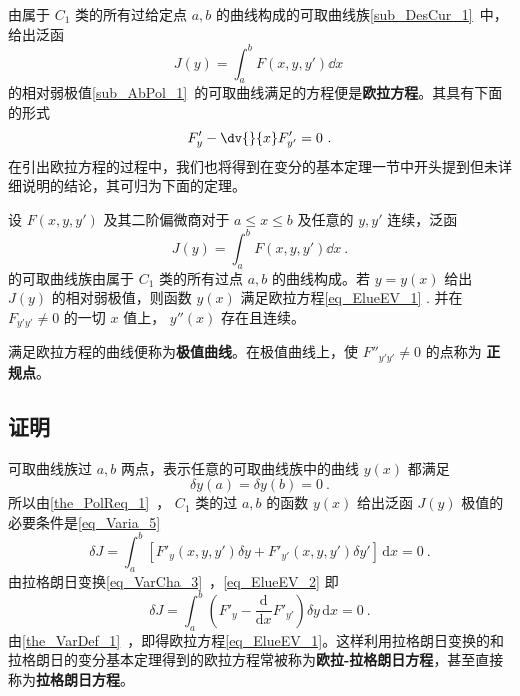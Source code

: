 
由属于 $C_1$ 类的所有过给定点 $a,b$ 的曲线构成的可取曲线族\autoref{sub_DesCur_1}~中，给出泛函 
\begin{equation}
J(y)=\int_a^bF(x,y,y')\dd x~
\end{equation}
的相对弱极值\autoref{sub_AbPol_1}~的可取曲线满足的方程便是\textbf{欧拉方程}。其具有下面的形式
\begin{equation}\label{eq_ElueEV_1}
F'_y-\dv{}{x}F'_{y'}=0~.
\end{equation}
在引出欧拉方程的过程中，我们也将得到在变分的基本定理一节中开头提到但未详细说明的结论，其可归为下面的定理。
\begin{theorem}{}
设 $F(x,y,y')$ 及其二阶偏微商对于 $a\leq x\leq b$ 及任意的 $y,y'$ 连续，泛函
\begin{equation}
J(y)=\int_a^b F(x,y,y')\dd x~.
\end{equation}
的可取曲线族由属于 $C_1$ 类的所有过点 $a,b$ 的曲线构成。若 $y=y(x)$ 给出 $J(y)$ 的相对弱极值，则函数 $y(x)$ 满足欧拉方程\autoref{eq_ElueEV_1} .
并在 $F_{y'y'}\neq0$ 的一切 $x$ 值上， $y''(x)$ 存在且连续。

\end{theorem}
满足欧拉方程的曲线便称为\textbf{极值曲线}。在极值曲线上，使 $F''_{y'y'}\neq0$ 的点称为 \textbf{正规点}。
\subsection{证明}
可取曲线族过 $a,b$ 两点，表示任意的可取曲线族中的曲线 $y(x)$ 都满足 
\begin{equation}
\delta y(a)=\delta y(b)=0~.
\end{equation}
所以由\autoref{the_PolReq_1}~， $C_1$ 类的过 $a,b$ 的函数 $y(x)$ 给出泛函 $J(y)$ 极值的必要条件是\autoref{eq_Varia_5}~
\begin{equation}\label{eq_ElueEV_2}
\delta J=\int_a^b \left[F'_y(x,y,y')\delta y+F'_{y'}(x,y,y')\delta y' \right]  \,\mathrm{d}{x} =0~.
\end{equation}
由拉格朗日变换\autoref{eq_VarCha_3}~，\autoref{eq_ElueEV_2} 即
\begin{equation}
\delta J=\int_a^b \left(F'_y- \frac{\mathrm{d}{}}{\mathrm{d}{x}} F'_{y'} \right) \delta y \,\mathrm{d}{x} =0~.
\end{equation}
由\autoref{the_VarDef_1}~，即得欧拉方程\autoref{eq_ElueEV_1}。这样利用拉格朗日变换的和拉格朗日的变分基本定理得到的欧拉方程常被称为\textbf{欧拉-拉格朗日方程}，甚至直接称为\textbf{拉格朗日方程}。


